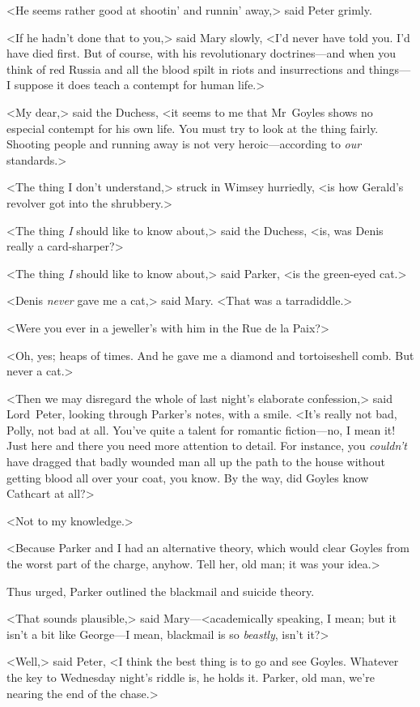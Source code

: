 <He seems rather good at shootin' and runnin' away,> said Peter grimly.

<If he hadn't done that to you,> said Mary slowly, <I'd never have told you. I'd have died first. But of course, with his revolutionary doctrines—and when you think of red Russia and all the blood spilt in riots and insurrections and things—I suppose it does teach a contempt for human life.>

<My dear,> said the Duchess, <it seems to me that Mr~Goyles shows no especial contempt for his own life. You must try to look at the thing fairly. Shooting people and running away is not very heroic—according to \emph{our} standards.>

<The thing I don't understand,> struck in Wimsey hurriedly, <is how Gerald's revolver got into the shrubbery.>

<The thing \emph{I} should like to know about,> said the Duchess, <is, was Denis really a card-sharper?>

<The thing \emph{I} should like to know about,> said Parker, <is the green-eyed cat.>

<Denis \emph{never} gave me a cat,> said Mary. <That was a tarradiddle.>

<Were you ever in a jeweller's with him in the Rue de la Paix?>

<Oh, yes; heaps of times. And he gave me a diamond and tortoiseshell comb. But never a cat.>

<Then we may disregard the whole of last night's elaborate confession,> said Lord~Peter, looking through Parker's notes, with a smile. <It's really not bad, Polly, not bad at all. You've quite a talent for romantic fiction—no, I mean it! Just here and there you need more attention to detail. For instance, you \emph{couldn't} have dragged that badly wounded man all up the path to the house without getting blood all over your coat, you know. By the way, did Goyles know Cathcart at all?>

<Not to my knowledge.>

<Because Parker and I had an alternative theory, which would clear Goyles from the worst part of the charge, anyhow. Tell her, old man; it was your idea.>

Thus urged, Parker outlined the blackmail and suicide theory.

<That sounds plausible,> said Mary—<academically speaking, I mean; but it isn't a bit like George—I mean, blackmail is so \emph{beastly}, isn't it?>

<Well,> said Peter, <I think the best thing is to go and see Goyles.  Whatever the key to Wednesday night's riddle is, he holds it. Parker, old man, we're nearing the end of the chase.>
